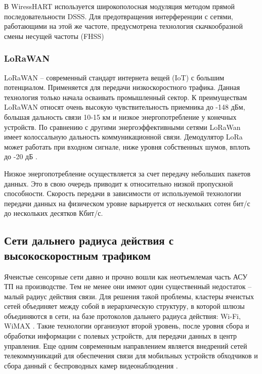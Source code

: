 В WiressHART используется широкополосная модуляция методом прямой последовательности DSSS. Для предотвращения интерференции с сетями, работающими на этой же частоте, предусмотрена технология скачкообразной смены несущей частоты (FHSS) \cite{Tagirov2013}

\subsubsection{LoRaWAN}
LoRaWAN -- современный стандарт интернета вещей (IoT) с большим потенциалом. Применяется для передачи низкоскоростного трафика. Данная технология только начала осваивать промышленный сектор. К преимуществам LoRaWAN относят очень высокую чувствительность приемника до -148 дБм, большая дальность связи 10-15 км и низкое энергопотребление у конечных устройств. По сравнению с другими энергоэффективными сетями LoRaWan имеет колоссальную дальность коммуникационной связи. Демодулятор LoRa может работать при входном сигнале, ниже уровня собственных шумов, вплоть до -20 дБ \cite{Yang2020}. 

Низкое энергопотребление осуществляется за счет передачу небольших пакетов данных. Это в свою очередь приводит к относительно низкой пропускной способности. Скорость передачи в зависимости от используемой технологии передачи данных на физическом уровне варьируется от нескольких сотен бит/с до нескольких десятков Кбит/с.





\subsection{Сети дальнего радиуса действия с высокоскоростным трафиком}

Ячеистые сенсорные сети давно и прочно вошли как неотъемлемая часть АСУ ТП на производстве. Тем не менее они имеют один существенный недостаток -- малый радиус действия связи. Для решения такой проблемы, кластеры ячеистых сетей объединяет между собой в иерархическую структуру, в которой шлюзы объединяются в сети, на базе протоколов дальнего радиуса действия: Wi-Fi, WiMAX \cite{Savazzi2013}. Такие технологии организуют второй уровень, после уровня сбора и обработки информации с полевых устройств, для передачи данных в центр управления. Еще одним современным направлением является внедрений сетей телекоммуникаций для обеспечения связи для мобильных устройств обходчиков и сбора данный с беспроводных камер видеонаблюдения \cite{Sidney2015}.







